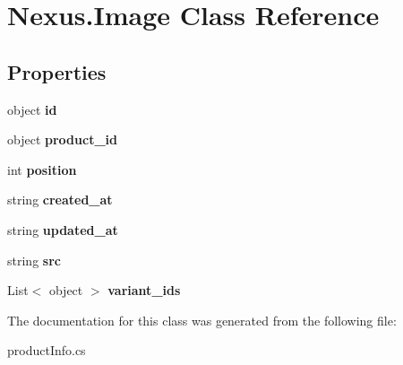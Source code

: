 \hypertarget{class_nexus_1_1_image}{}\section{Nexus.\+Image Class Reference}
\label{class_nexus_1_1_image}
\subsection*{Properties}
\begin{DoxyCompactItemize}
\item 
\mbox{\label{class_nexus_1_1_image_a1a63771b8a1aee7db96faedfe41a5a56}} 
object {\bfseries id}
\item 
\mbox{\label{class_nexus_1_1_image_a98bc68b609796d468433cef68f11b720}} 
object {\bfseries product\+\_\+id}
\item 
\mbox{\label{class_nexus_1_1_image_a7e562ca89afb746a484310791d4a7084}} 
int {\bfseries position}
\item 
\mbox{\label{class_nexus_1_1_image_a114e205f8fc0ee88537e79bfc85f35f2}} 
string {\bfseries created\+\_\+at}
\item 
\mbox{\label{class_nexus_1_1_image_ac6126e15ebf7f29528702599385e83cc}} 
string {\bfseries updated\+\_\+at}
\item 
\mbox{\label{class_nexus_1_1_image_a28cc6581c16c12d84a945304a4d2b1b8}} 
string {\bfseries src}
\item 
\mbox{\label{class_nexus_1_1_image_a2309fb87a11be080942c6f40ab6305cb}} 
List$<$ object $>$ {\bfseries variant\+\_\+ids}
\end{DoxyCompactItemize}


The documentation for this class was generated from the following file\+:\begin{DoxyCompactItemize}
\item 
product\+Info.\+cs\end{DoxyCompactItemize}
